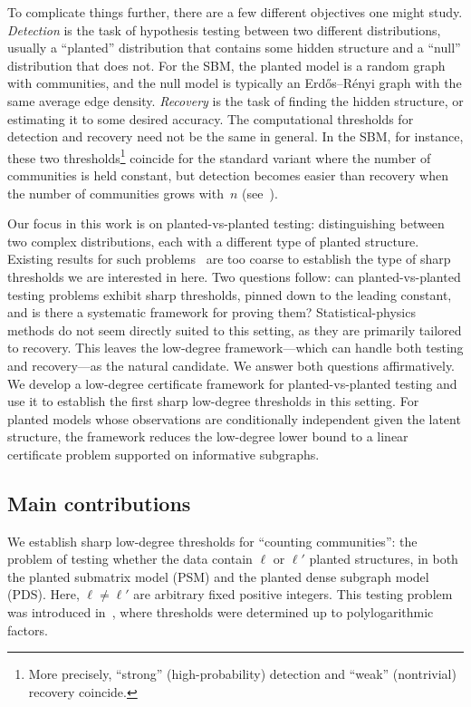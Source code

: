 \documentclass[11pt, letterpaper]{article}
\numberwithin{equation}{section}
\begin{document}
To complicate things further, there are a few different objectives one might study. \emph{Detection} is the task of hypothesis testing between two different distributions, usually a ``planted'' distribution that contains some hidden structure and a ``null'' distribution that does not. For the SBM, the planted model is a random graph with communities, and the null model is typically an Erd\H{o}s--R\'enyi graph with the same average edge density. \emph{Recovery} is the task of finding the hidden structure, or estimating it to some desired accuracy. The computational thresholds for detection and recovery need not be the same in general. In the SBM, for instance, these two thresholds\footnote{More precisely, ``strong'' (high-probability) detection and ``weak'' (nontrivial) recovery coincide.} coincide for the standard variant where the number of communities is held constant, but detection becomes easier than recovery when the number of communities grows with~$n$ (see~\cite{sbm-many,sbm-many-2}). 

Our focus in this work is on planted-vs-planted testing:  distinguishing between two complex distributions, each with a different type of planted structure. 
Existing results for such problems~\cite{rush2023easier,coloring-clique,fourier-geo,carpentier2025low} are too coarse to establish the type of sharp thresholds we are interested in here. Two questions follow: can planted-vs-planted testing problems exhibit sharp thresholds, pinned down to the leading constant, and is there a systematic framework for proving them? Statistical-physics methods do not seem directly suited to this setting, as they are primarily tailored to recovery. This leaves the low-degree framework---which can handle both testing and recovery---as the natural candidate. We answer both questions affirmatively. We develop a low-degree certificate framework for planted-vs-planted testing and use it to establish the first sharp low-degree thresholds in this setting. For planted models whose observations are conditionally independent given the latent structure, the framework reduces the low-degree lower bound to a linear certificate problem supported on informative subgraphs.

\subsection{Main contributions}
We establish sharp low-degree thresholds for ``counting communities'': the problem of testing whether the data contain $\ell$ or $\ell'$ planted structures, in both the planted submatrix model (PSM) and the planted dense subgraph model (PDS). Here, $\ell\neq\ell'$ are arbitrary fixed positive integers. This testing problem was introduced in~\cite{rush2023easier}, where thresholds were determined up to polylogarithmic factors. 
\end{document}
